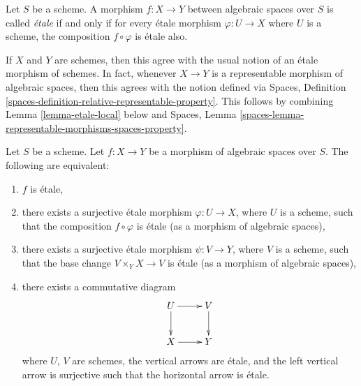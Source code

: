 \begin{definition}
\label{definition-etale}
Let $S$ be a scheme.
A morphism $f : X \to Y$ between algebraic spaces over $S$ is
called {\it \'etale} if and only if for every \'etale morphism
$\varphi : U \to X$ where $U$ is a scheme, the composition
$f \circ \varphi$ is \'etale also.
\end{definition}

\noindent
If $X$ and $Y$ are schemes, then this agree with the usual notion of an
\'etale morphism of schemes. In fact, whenever $X \to Y$ is a representable
morphism of algebraic spaces, then this agrees with the notion defined via
Spaces, Definition \ref{spaces-definition-relative-representable-property}.
This follows by combining Lemma \ref{lemma-etale-local} below and
Spaces, Lemma \ref{spaces-lemma-representable-morphisms-spaces-property}.

\begin{lemma}
\label{lemma-etale-local}
Let $S$ be a scheme.
Let $f : X \to Y$ be a morphism of algebraic spaces over $S$.
The following are equivalent:
\begin{enumerate}
\item $f$ is \'etale,
\item there exists a surjective \'etale morphism $\varphi : U \to X$,
where $U$ is a scheme, such that the composition $f \circ \varphi$ is
\'etale (as a morphism of algebraic spaces),
\item there exists a surjective \'etale morphism $\psi : V \to Y$,
where $V$ is a scheme, such that the base change $V \times_Y X \to V$
is \'etale (as a morphism of algebraic spaces),
\item there exists a commutative diagram
$$
\xymatrix{
U \ar[d] \ar[r] & V \ar[d] \\
X \ar[r] & Y
}
$$
where $U$, $V$ are schemes, the vertical arrows are \'etale, and the
left vertical arrow is surjective such that the horizontal arrow is \'etale.
\end{enumerate}
\end{lemma}

